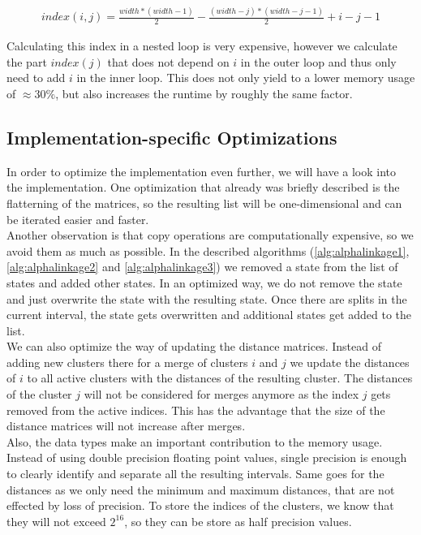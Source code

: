 \begin{equation}
    \begin{aligned}
        index(i,j) = \frac{width * (width - 1)}{2} - \frac{(width - j) * (width - j - 1)}{2} + i - j - 1
    \end{aligned}
    \label{eq:indexing}
\end{equation}

Calculating this index in a nested loop is very expensive, however we calculate the part $index(j)$ that does not depend on $i$ in the outer loop and thus only need to add $i$ in the inner loop. This does not only yield to a lower memory usage of $\approx 30\%$, but also increases the runtime by roughly the same factor.

\subsection{Implementation-specific Optimizations}

In order to optimize the implementation even further, we will have a look into the implementation. One optimization that already was briefly described is the flatterning of the matrices, so the resulting list will be one-dimensional and can be iterated easier and faster.\\

Another observation is that copy operations are computationally expensive, so we avoid them as much as possible. In the described algorithms (\ref{alg:alphalinkage1}, \ref{alg:alphalinkage2} and \ref{alg:alphalinkage3}) we removed a state from the list of states and added other states. In an optimized way, we do not remove the state and just overwrite the state with the resulting state. Once there are splits in the current interval, the state gets overwritten and additional states get added to the list.\\

We can also optimize the way of updating the distance matrices. Instead of adding new clusters there for a merge of clusters $i$ and $j$ we update the distances of $i$ to all active clusters with the distances of the resulting cluster. The distances of the cluster $j$ will not be considered for merges anymore as the index $j$ gets removed from the active indices. This has the advantage that the size of the distance matrices will not increase after merges.\\

Also, the data types make an important contribution to the memory usage. Instead of using double precision floating point values, single precision is enough to clearly identify and separate all the resulting intervals. Same goes for the distances as we only need the minimum and maximum distances, that are not effected by loss of precision. To store the indices of the clusters, we know that they will not exceed $2^{16}$, so they can be store as half precision values.
